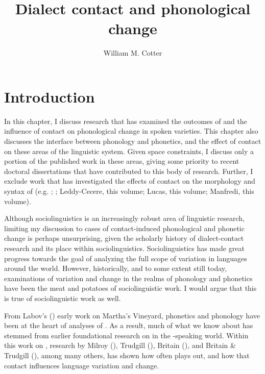 \documentclass[output=paper]{langsci/langscibook}
\author{William M. Cotter\affiliation{University of Arizona}}
\title{Dialect contact and phonological change}
\begin{document}
\maketitle 
 
 
\section{Introduction}

In this chapter, I discuss research that has examined the outcomes of   and the influence of contact on phonological change in spoken  varieties. This chapter also discusses the interface between phonology and phonetics, and the effect of contact on these areas of the linguistic system. Given space constraints, I discuss only a portion of the published work in these areas, giving some priority to recent doctoral dissertations that have contributed to this body of research. Further, I exclude work that has investigated the effects of contact on the morphology and syntax of  (e.g. \citealt{Al-WerEtAl2015}; \citealt{GafterHoresh2015}; Leddy-Cecere, this volume; Lucas, this volume; Manfredi, this volume). 

  Although  sociolinguistics is an increasingly robust area of linguistic research, limiting my discussion to cases of contact-induced phonological and phonetic change is perhaps unsurprising, given the scholarly history of dialect-contact research and its place within sociolinguistics. Sociolinguistics has made great progress towards the goal of analyzing the full scope of variation in languages around the world. However, historically, and to some extent still today, examinations of variation and change in the realms of phonology and phonetics have been the meat and potatoes of sociolinguistic work. I would argue that this is true of  sociolinguistic work as well. 

  From Labov's (\citeyear{Labov1963}) early work on Martha’s Vineyard, phonetics and phonology have been at the heart of analyses of . As a result, much of what we know about   has stemmed from earlier foundational research on  in the -speaking world. Within this work on , research by Milroy (\citeyear{Milroy1987}), Trudgill (\citeyear{Trudgill1986,Trudgill2004}), Britain (\citeyear{Britain2002}), and Britain \& Trudgill (\citeyear{BritainTrudgill2009}), among many others, has shown how  often plays out, and how that contact influences language variation and change. 
\end{document}
